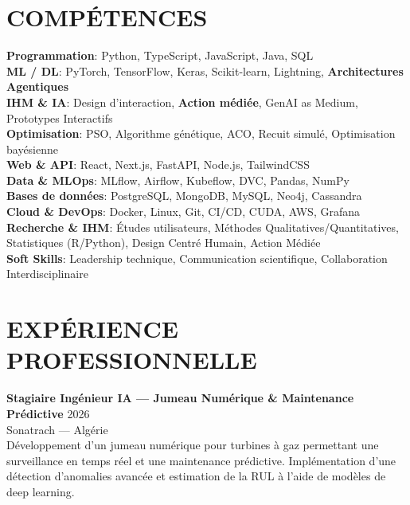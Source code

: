 \documentclass[a4paper,12pt]{article}
\begin{document}
\section{COMPÉTENCES}
\setlength{\parskip}{-1pt}
{\normalsize
\textbf{Programmation}: Python, TypeScript, JavaScript, Java, SQL \\

\textbf{ML / DL}: PyTorch, TensorFlow, Keras, Scikit-learn, Lightning, \textbf{Architectures Agentiques} \\

\textbf{IHM \& IA}: Design d'interaction, \textbf{Action médiée}, GenAI as Medium, Prototypes Interactifs \\

\textbf{Optimisation}: PSO, Algorithme génétique, ACO, Recuit simulé, Optimisation bayésienne \\

\textbf{Web \& API}: React, Next.js, FastAPI, Node.js, TailwindCSS \\

\textbf{Data \& MLOps}: MLflow, Airflow, Kubeflow, DVC, Pandas, NumPy \\

\textbf{Bases de données}: PostgreSQL, MongoDB, MySQL, Neo4j, Cassandra \\

\textbf{Cloud \& DevOps}: Docker, Linux, Git, CI/CD, CUDA, AWS, Grafana \\

\textbf{Recherche \& IHM}: Études utilisateurs, Méthodes Qualitatives/Quantitatives, Statistiques (R/Python), Design Centré Humain, Action Médiée \\

\textbf{Soft Skills}: Leadership technique, Communication scientifique, Collaboration Interdisciplinaire
}

\section{EXPÉRIENCE PROFESSIONNELLE}
\textbf{Stagiaire Ingénieur IA — Jumeau Numérique \& Maintenance Prédictive} \hfill 2026 \\
Sonatrach — Algérie \\
Développement d’un jumeau numérique pour turbines à gaz permettant une surveillance en temps réel et une maintenance prédictive. Implémentation d’une détection d’anomalies avancée et estimation de la RUL à l’aide de modèles de deep learning.
\end{document}
